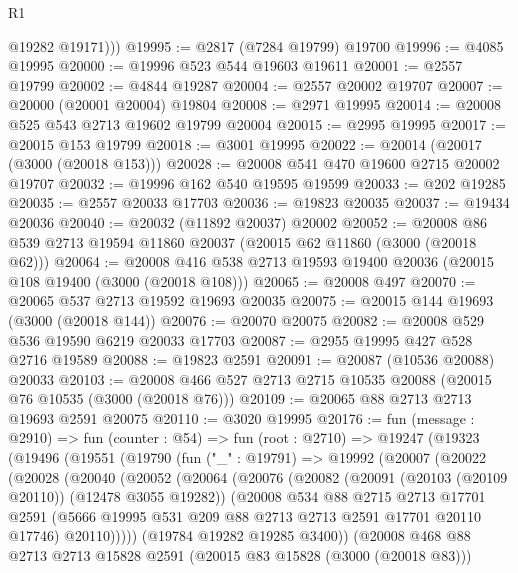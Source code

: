 \begin{lexlean}{R1}
\begin{coremodule}
          @19282
          @19171)))
@19995 := @2817 (@7284 @19799) @19700
@19996 := @4085 @19995
@20000 := @19996 @523 @544 @19603 @19611
@20001 := @2557 @19799
@20002 := @4844 @19287
@20004 := @2557 @20002 @19707
@20007 := @20000 (@20001 @20004) @19804
@20008 := @2971 @19995
@20014 := @20008 @525 @543 @2713 @19602 @19799 @20004
@20015 := @2995 @19995
@20017 := @20015 @153 @19799
@20018 := @3001 @19995
@20022 := @20014 (@20017 (@3000 (@20018 @153)))
@20028 := @20008 @541 @470 @19600 @2715 @20002 @19707
@20032 := @19996 @162 @540 @19595 @19599
@20033 := @202 @19285
@20035 := @2557 @20033 @17703
@20036 := @19823 @20035
@20037 := @19434 @20036
@20040 := @20032 (@11892 @20037) @20002
@20052 := @20008 @86 @539 @2713 @19594 @11860 @20037 (@20015 @62 @11860 (@3000 (@20018 @62)))
@20064 := @20008 @416 @538 @2713 @19593 @19400 @20036 (@20015 @108 @19400 (@3000 (@20018 @108)))
@20065 := @20008 @497
@20070 := @20065 @537 @2713 @19592 @19693 @20035
@20075 := @20015 @144 @19693 (@3000 (@20018 @144))
@20076 := @20070 @20075
@20082 := @20008 @529 @536 @19590 @6219 @20033 @17703
@20087 := @2955 @19995 @427 @528 @2716 @19589
@20088 := @19823 @2591
@20091 := @20087 (@10536 @20088) @20033
@20103 := @20008 @466 @527 @2713 @2715 @10535 @20088 (@20015 @76 @10535 (@3000 (@20018 @76)))
@20109 := @20065 @88 @2713 @2713 @19693 @2591 @20075
@20110 := @3020 @19995
@20176 := fun (message : @2910) =>
  fun (counter : @54) =>
  fun (root : @2710) =>
  @19247
    (@19323
      (@19496
        (@19551
          (@19790
            (fun ("_" : @19791) =>
            @19992
              (@20007
                (@20022
                  (@20028
                    (@20040
                      (@20052
                        (@20064
                          (@20076
                            (@20082
                              (@20091 (@20103 (@20109 @20110)) (@12478 @3055 @19282))
                              (@20008
                                @534
                                @88
                                @2715
                                @2713
                                @17701
                                @2591
                                (@5666 @19995 @531 @209 @88 @2713 @2713 @2591 @17701 @20110 @17746)
                                @20110)))))
                      (@19784 @19282 @19285 @3400))
                    (@20008
                      @468
                      @88
                      @2713
                      @2713
                      @15828
                      @2591
                      (@20015 @83 @15828 (@3000 (@20018 @83)))

\end{coremodule}
\end{lexlean}
